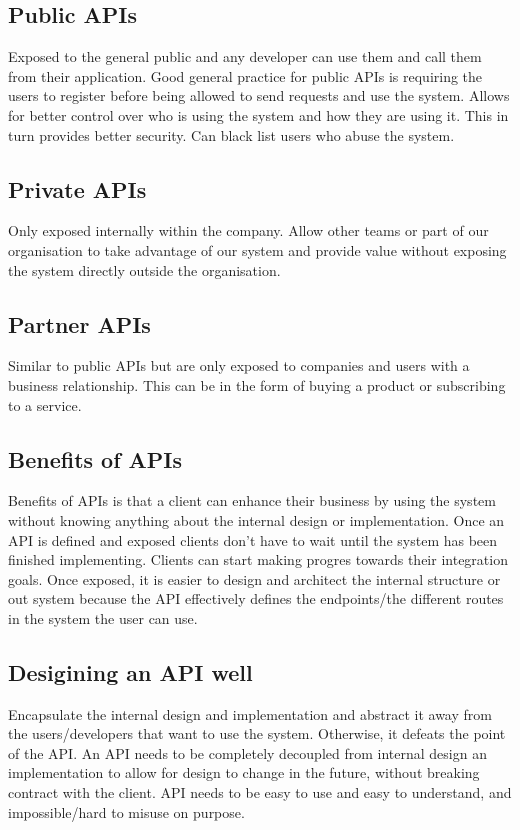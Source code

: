 \documentclass[a4paper, 11pt]{book}
\begin{document}
    \subsection{Public APIs}
    Exposed to the general public and any developer can use them and call them from their application.
    Good general practice for public APIs is requiring the users to register before being allowed to send requests and use the system.
    Allows for better control over who is using the system and how they are using it.
    This in turn provides better security.
    Can black list users who abuse the system.

    \subsection{Private APIs}
    Only exposed internally within the company.
    Allow other teams or part of our organisation to take advantage of our system and provide value without exposing the system directly outside the organisation.

    \subsection{Partner APIs}
    Similar to public APIs but are only exposed to companies and users with a business relationship.
    This can be in the form of buying a product or subscribing to a service.

    \subsection{Benefits of APIs}
    Benefits of APIs is that a client can enhance their business by using the system without knowing anything about the internal design or implementation.
    Once an API is defined and exposed clients don't have to wait until the system has been finished implementing.
    Clients can start making progres towards their integration goals.
    Once exposed, it is easier to design and architect the internal structure or out system because the API effectively defines the endpoints/the different routes in the system the user can use.

    \subsection{Desigining an API well}
    Encapsulate the internal design and implementation and abstract it away from the users/developers that want to use the system.
    Otherwise, it defeats the point of the API.
    An API needs to be completely decoupled from internal design an implementation to allow for design to change in the future, without breaking contract with the client.
    API needs to be easy to use and easy to understand, and impossible/hard to misuse on purpose.
\end{document}
